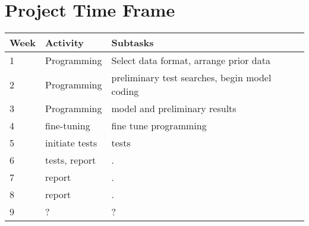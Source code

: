 \documentclass[10pt,letterpaper,final]{article}
\begin{document}
\section{Project Time Frame}
\begin{center}
	\begin{tabular}{lll}
		Week & Activity & Subtasks \\ \hline
		1 & Programming & Select data format, arrange prior data \\
		2 & Programming & preliminary test searches, begin model coding \\
		3 & Programming & model and preliminary results \\
		4 & fine-tuning & fine tune programming \\
		5 & initiate tests & tests \\
		6 & tests, report & . \\
		7 & report & . \\
		8 & report & . \\
		9 & ? & ? \\
	\end{tabular}
	\label{tab:timeestimates}
\end{center}




%
%
\end{document}
